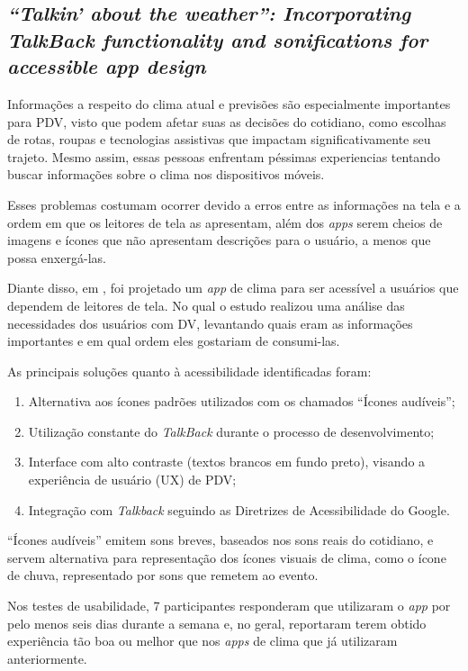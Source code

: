 \subsection{\emph{``Talkin' about the weather'': Incorporating TalkBack functionality and sonifications for accessible app design}}

Informações a respeito do clima atual e previsões são especialmente importantes para PDV, visto que podem afetar suas as decisões
do cotidiano, como escolhas de rotas, roupas e tecnologias assistivas que impactam significativamente seu trajeto.
Mesmo assim, essas pessoas enfrentam péssimas experiencias tentando buscar informações sobre o clima nos dispositivos móveis.

Esses problemas costumam ocorrer devido a erros entre as informações na tela e a ordem em que os leitores de tela as apresentam, além dos
\emph{apps} serem cheios de imagens e ícones que não apresentam descrições para o usuário, a menos que possa enxergá-las.

Diante disso, em , foi projetado um \emph{app} de clima para ser acessível a usuários que dependem
de leitores de tela. No qual o estudo realizou uma análise das necessidades dos usuários com DV, levantando quais eram as informações
importantes e em qual ordem eles gostariam de consumi-las.

As principais soluções quanto à acessibilidade identificadas foram:

\begin{enumerate}
  \item Alternativa aos ícones padrões utilizados com os chamados ``Ícones audíveis'';
  \item Utilização constante do \emph{TalkBack} durante o processo de desenvolvimento;
  \item Interface com alto contraste (textos brancos em fundo preto), visando a experiência de usuário (UX) de PDV\@;
  \item Integração com \emph{Talkback} seguindo as Diretrizes de Acessibilidade do Google.
\end{enumerate}

``Ícones audíveis'' emitem sons breves, baseados nos sons reais do cotidiano, e servem alternativa para representação dos ícones
visuais de clima, como o ícone de chuva, representado por sons que remetem ao evento.

Nos testes de usabilidade, 7 participantes responderam que utilizaram o \emph{app} por pelo menos seis dias durante a semana e, no geral, reportaram terem obtido experiência tão boa ou melhor que nos \emph{apps} de clima que já utilizaram anteriormente.

